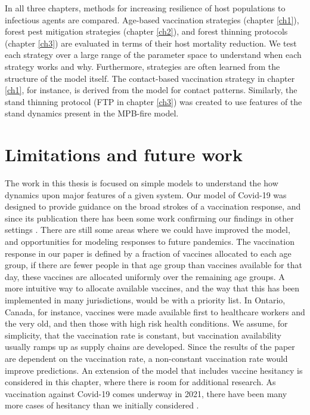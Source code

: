 In all three chapters, methods for increasing resilience of host populations to infectious agents are compared. Age-based vaccination strategies (chapter \ref{ch1}), forest pest mitigation strategies (chapter \ref{ch2}), and forest thinning protocols  (chapter \ref{ch3}) are evaluated in terms of their host mortality reduction. We test each strategy over a large range of the parameter space to understand when each strategy works and why. Furthermore, strategies are often learned from the structure of the model itself. The contact-based vaccination strategy in chapter \ref{ch1}, for instance, is derived from the model for contact patterns. Similarly, the stand thinning protocol (FTP in chapter \ref{ch3}) was created to use features of the stand dynamics present in the MPB-fire model.


\section{Limitations and future work}

The work in this thesis is focused on simple models to understand the how dynamics upon major features of a given system. Our model of Covid-19 was designed to provide guidance on the broad strokes of a vaccination response, and since its publication there has been some work confirming our findings in other settings \cite{chen2021age,hogan2021within}. There are still some areas where we could have improved the model, and opportunities for modeling responses to future pandemics. The vaccination response in our paper is defined by a fraction of vaccines allocated to each age group, if there are fewer people in that age group than vaccines available for that day, these vaccines are allocated uniformly over the remaining age groups. A more intuitive way to allocate available vaccines, and the way that this has been implemented in many jurisdictions, would be with a priority list. In Ontario, Canada, for instance, vaccines were made available first to healthcare workers and the very old, and then those with high risk health conditions.  We assume, for simplicity, that the vaccination rate is constant, but vaccination availability usually ramps up as supply chains are developed. Since the results of the paper are dependent on the vaccination rate, a non-constant vaccination rate would improve predictions. An extension of the model that includes vaccine hesitancy is considered in this chapter, where there is room for additional research. As vaccination against Covid-19 comes underway in 2021, there have been many more cases of hesitancy than we initially considered \cite{schwarzinger2021covid,soares2021factors,callaghan2020correlates}. 

